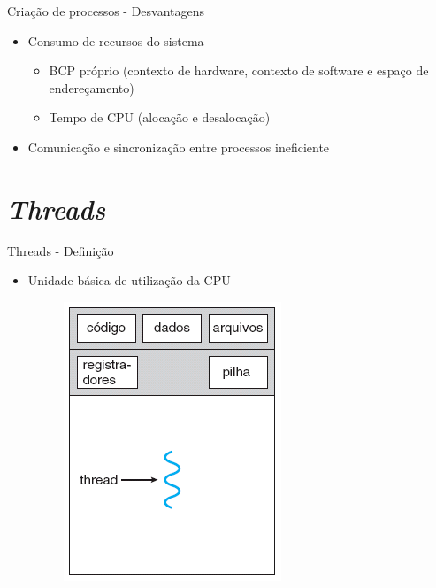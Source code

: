 \documentclass[aspectratio=169,
				xcolor=table]{beamer}
\begin{document}
	\begin{frame}{Criação de processos - Desvantagens}
		\begin{itemize}
			\item Consumo de recursos do sistema
			\begin{itemize}
				\item BCP próprio (contexto de hardware, contexto de software e espaço de endereçamento)
				\item Tempo de CPU (alocação e desalocação)
			\end{itemize}
			\vspace{1em}
			\item Comunicação e sincronização entre processos ineficiente
		\end{itemize}		
	\end{frame}
	
	\section{\textit{Threads}}
	
	\begin{frame}{Threads - Definição}
		\begin{itemize}
			\item Unidade básica de utilização da CPU
			\vspace{1em}
			
			\begin{figure}[hbtp]
				\centering
				\includegraphics[keepaspectratio, height=.6\textheight]{../figs/cap04/monothread.png}
			\end{figure}
		\end{itemize}
	\end{frame}
	
\end{document}
